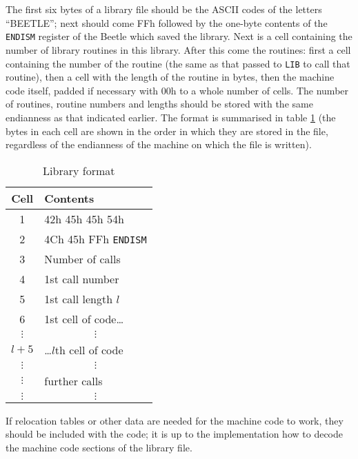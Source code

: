The first six bytes of a library file should be the ASCII codes of the letters
``BEETLE''; next should come FFh followed by the one-byte contents of the {\tt
ENDISM} register of the Beetle which saved the library. Next is a cell
containing the number of library routines in this library. After this come the
routines: first a cell containing the number of the routine (the same as that
passed to {\tt LIB} to call that routine), then a cell with the length of the
routine in bytes, then the machine code itself, padded if necessary with 00h to
a whole number of cells. The number of routines, routine numbers and lengths
should be stored with the same endianness as that indicated earlier. The format
is summarised in table \ref{libtable} (the bytes in each cell are shown in the
order in which they are stored in the file, regardless of the endianness of the
machine on which the file is written).

\begin{table}[htbp]
\begin{center}
\begin{tabular}{|c|l|} \hline
\rule[-2mm]{0mm}{6mm}\bf Cell & \bf Contents \\ \hline
1 & 42h 45h 45h 54h \\ \hline
2 & 4Ch 45h FFh {\tt ENDISM} \\ \hline
3 & Number of calls \\ \hline
4 & 1st call number \\ \hline
5 & 1st call length $l$\/ \\ \hline
6 & 1st cell of code\dots \\ \hline
$\vdots$ & \multicolumn{1}{c|}{$\vdots$} \\ \hline
$l+5$\/ & \dots$l$\/th cell of code \\ \hline
$\vdots$ & \multicolumn{1}{c|}{$\vdots$} \\ \hline
$\vdots$ & further calls \\ \hline
$\vdots$ & \multicolumn{1}{c|}{$\vdots$} \\ \hline
\end{tabular}
\end{center}
\vspace{-2mm}
\caption{\label{libtable}Library format}
\end{table}

If relocation tables or other data are needed for the machine code to work, they
should be included with the code; it is up to the implementation how to decode
the machine code sections of the library file.



